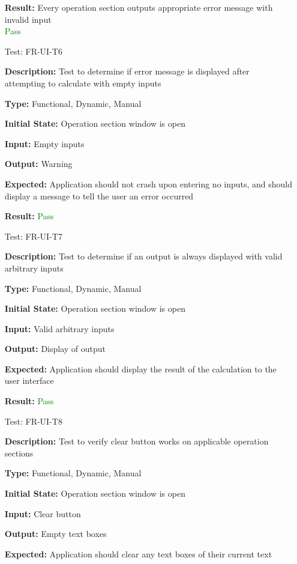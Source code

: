\documentclass[12pt, titlepage]{article}
\begin{document}
\begin{enumerate}
\textbf{Result:} Every operation section outputs appropriate error message with invalid input\\
\textcolor{Green}{Pass}


\item[Test:]{FR-UI-T6\\}

\textbf{Description:} Test to determine if error message is displayed after attempting to calculate with empty inputs

\textbf{Type:} Functional, Dynamic, Manual
					
\textbf{Initial State:} Operation section window is open
					
\textbf{Input:} Empty inputs

\textbf{Output:} Warning

\textbf{Expected:} Application should not crash upon entering no inputs, and should display a message to tell the user an error occurred

\textbf{Result:} \textcolor{Green}{Pass}


\item[Test:]{FR-UI-T7\\}

\textbf{Description:} Test to determine if an output is always displayed with valid arbitrary inputs

\textbf{Type:} Functional, Dynamic, Manual
					
\textbf{Initial State:} Operation section window is open
					
\textbf{Input:} Valid arbitrary inputs
					
\textbf{Output:} Display of output

\textbf{Expected:} Application should display the result of the calculation to the user interface

\textbf{Result:} \textcolor{Green}{Pass}
					

\item[Test:]{FR-UI-T8\\}

\textbf{Description:} Test to verify clear button works on applicable operation sections

\textbf{Type:} Functional, Dynamic, Manual
					
\textbf{Initial State:} Operation section window is open
					
\textbf{Input:} Clear button
					
\textbf{Output:} Empty text boxes

\textbf{Expected:} Application should clear any text boxes of their current text


\end{enumerate}
\end{document}
